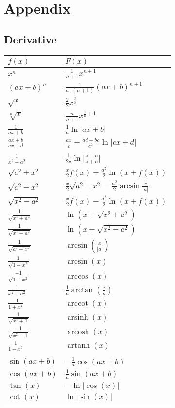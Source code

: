 \section{Appendix}

\subsection{Derivative}

	\begin{tabular}{l|l}
		$f(x)$ & $F(x)$ \\ \hline

		$ x^n $   &   $ \frac{1}{n+1} x^{n+1} $ \\
		$ (ax+b)^n $  &  $ \frac{1}{a\cdot(n+1)} (ax+b)^{n+1} $ \\
		$ \sqrt x $  &  $ \frac{2}{3} x^{ \frac{3}{2} } $ \\
		$ \sqrt[n] x $  &  $ \frac{n}{n+1} x^{ \frac{1}{n}+1 } $ \\
		$ \frac{1}{ax+b} $  &  $ \frac{1}{a} \ln |ax+b| $ \\
		$ \frac{ax+b}{cx+d} $  &  $ \frac{ax}{c}-\frac{ad-bc}{c^2} \ln |cx+d| $ \\
		$  $  &  $  $ \\
		$ \frac{1}{x^2-a^2} $  &  $ \frac{1}{2a} \ln { \big| \frac{x-a}{x+a} \big| } $ \\
		$ \sqrt{a^2+x^2} $  &  $ \frac{x}{2} f(x) + \frac{a^2}{2} \ln ( x+f(x) ) $ \\
		$ \sqrt{a^2-x^2} $  &  $ \frac{x}{2} \sqrt{a^2-x^2} - \frac{a^2}{2} \arcsin \frac{x}{|a|}  $ \\
		$ \sqrt{x^2-a^2} $  &  $ \frac{x}{2} f(x) - \frac{a^2}{2} \ln {( x+f(x) )} $ \\
		$ \frac{1}{\sqrt{x^2+a^2}} $  &  $ \ln( x+\sqrt{x^2+a^2} ) $ \\
		$ \frac{1}{\sqrt{x^2-a^2}} $  &  $ \ln( x+\sqrt{x^2-a^2} ) $ \\
		$ \frac{1}{\sqrt{a^2-x^2}} $  &  $ \arcsin( \frac{x}{|a|} ) $ \\
		$ \frac{1}{\sqrt{1-x^2}} $  &  $ \arcsin( x ) $ \\
		$ \frac{-1}{\sqrt{1-x^2}} $  &  $ \arccos(x) $ \\
		$ \frac{1}{x^2+a^2} $  &  $ \frac{1}{a} \arctan(\frac{x}{a}) $ \\
		$ \frac{-1}{1+x^2} $  &  $ \operatorname{arccot}(x) $ \\
		$ \frac{1}{\sqrt{x^2+1}} $  &  $ \operatorname{arsinh} (x) $ \\
		$ \frac{-1}{\sqrt{x^2-1}} $  &  $ \operatorname{arcosh} (x) $ \\
		$ \frac{1}{1-x^2} $  &  $ \operatorname{artanh} (x) $ \\
		$  $  &  $  $ \\
		$ \sin(ax+b) $  &  $-\frac{1}{a}\cos(ax+b)  $ \\
		$ \cos(ax+b) $  &  $ \frac{1}{a}\sin(ax+b) $ \\
		$ \tan(x) $  &  $ -\ln|\cos(x)| $ \\
		$ \cot(x) $  &  $ \ln |\sin(x)| $ \\
	\end{tabular}
	
